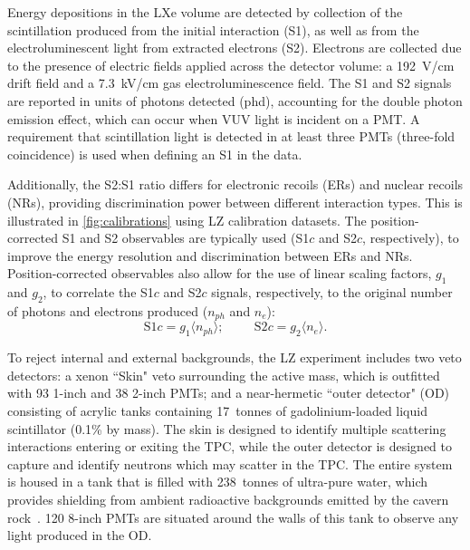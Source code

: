 \documentclass[reprint, showpacs,
preprintnumbers,
amsmath,amssymb,
aps, floatfix,
superscriptaddress,
prd, nofootinbib]{revtex4-1}
\begin{document}
Energy depositions in the LXe volume are detected by collection of the scintillation produced from the initial interaction (S1), as well as from the electroluminescent light from extracted electrons (S2).
Electrons are collected due to the presence of electric fields applied across the detector volume: a 192~V/cm drift field and a 7.3~kV/cm gas electroluminescence field. 
The S1 and S2 signals are reported in units of photons detected (phd), accounting for the double photon emission effect, which can occur when VUV light is incident on a PMT. A requirement that scintillation light is detected in at least three PMTs (three-fold coincidence) is used when defining an S1 in the data.
\par
Additionally, the S2:S1 ratio differs for electronic recoils (ERs) and nuclear recoils (NRs), providing discrimination power between different interaction types.
This is illustrated in \autoref{fig:calibrations} using LZ calibration datasets.
The position-corrected S1 and S2 observables are typically used (S1$c$ and S2$c$, respectively),  to improve the energy resolution and discrimination between ERs and NRs. 
Position-corrected observables also allow for the use of linear scaling factors, $g_1$ and $g_2$, to correlate the S1$c$ and S2$c$ signals, respectively, to the original number of photons and electrons produced ($n_{ph}$ and $n_e$): 
\begin{equation}
    \text{S1}c = g_1\langle n_{ph} \rangle; \hspace{1cm} \text{S2}c = g_2 \langle n_e \rangle. 
\label{eq:S1S2scale}
\end{equation}
\par
To reject internal and external backgrounds, the LZ experiment includes two veto detectors: a xenon ``Skin" veto surrounding the active mass, which is outfitted with 93 1-inch and 38 2-inch PMTs; and a near-hermetic ``outer detector" (OD) consisting of acrylic tanks containing 17~tonnes of gadolinium-loaded liquid scintillator (0.1\% by mass). 
The skin is designed to identify multiple scattering interactions entering or exiting the TPC, while the outer detector is designed to capture and identify neutrons which may scatter in the TPC. 
The entire system is housed in a tank that is filled with 238~tonnes of ultra-pure water, which provides shielding from ambient radioactive backgrounds emitted by the cavern rock~\cite{LZ:Experiment_2020, LZ:TDR_2017}.
120 8-inch PMTs are situated around the walls of this tank to observe any light produced in the OD.
\par
\end{document}
